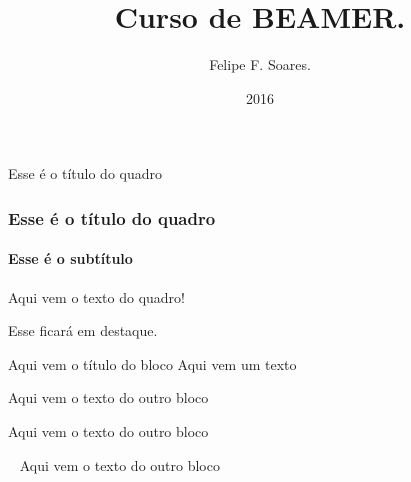 \documentclass{beamer}
\title{Curso de BEAMER.}
\author[Felipe]{Felipe F. Soares.}
\institute[UFC]{Universidade Federal do Ceará \\ ufc.br}
\date{2016}
\begin{document}
	\begin{frame}{Esse é o título do quadro}
		\titlepage
	\end{frame}
	
	\begin{frame}
		\frametitle{Esse é o título do quadro}
		\framesubtitle{Esse é o subtítulo}
		Aqui vem o texto do quadro!
		
		\alert{Esse ficará em destaque.} \pause
		\begin{block}{Aqui vem o título do bloco}
			Aqui vem um texto
		\end{block} \pause
		
		\begin{block}
			Aqui vem o texto do outro bloco
		\end{block} \pause
		
		\begin{block}{}
			Aqui vem o texto do outro bloco
		\end{block} \pause
		
		\begin{block}{\ }
			Aqui vem o texto do outro bloco
		\end{block}
	\end{frame}
\end{document}
